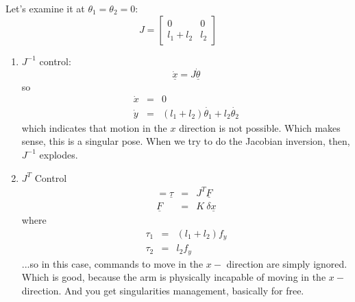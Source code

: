 \documentclass[]{article}
\begin{document}
Let's examine it at $\theta_{1} = \theta_{2} = 0$:
\begin{displaymath}
 J = \left[\begin{array}{cc} 0 & 0 \\ l_{1}+l_{2} & l_{2} \end{array} \right]
\end{displaymath}
\begin{enumerate}
 \item $J^{-1}$ control:
 \begin{displaymath}
  \underline{\dot{x}} = J\underline{\dot{\theta}}
 \end{displaymath}
so
\begin{eqnarray}
 \dot{x} & = & 0 \nonumber \\
 \dot{y} & = & (l_{1}+l_{2})\dot{\theta_{1}} + l_{2}\dot{\theta_{2}} \nonumber
\end{eqnarray}
which indicates that motion in the $x$ direction is not possible. Which makes sense, this is a singular pose. When we try to do the Jacobian inversion, then, $J^{-1}$ explodes.
\item $J^{T}$ Control
\begin{eqnarray}=
 \underline{\tau} & = & J^{T}\underline{F} \nonumber \\
 \underline{F} & = & K\ \delta\underline{x} \nonumber
\end{eqnarray}
where
\begin{eqnarray}
 \tau_{1} & = & (l_{1}+l_{2})f_{y} \nonumber \\
 \tau_{2} & = & l_{2}f_{y} \nonumber
\end{eqnarray}
...so in this case, commands to move in the $x-$ direction are simply ignored. Which is good, because the arm is physically incapable of moving in the $x-$direction. And you get singularities management, basically for free.
\end{enumerate}
\end{document}
